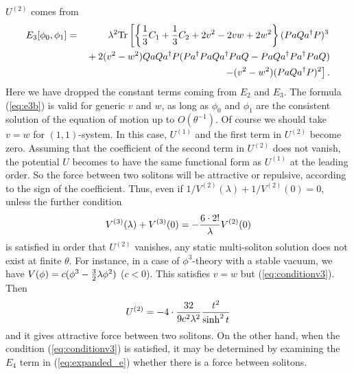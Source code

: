 \documentclass[a4paper,12pt]{article}
\begin{document}
$U^{(2)}$ comes from
\begin{eqnarray}
E_3[\phi_0,\phi_1]
 &=&\lambda^2{\rm Tr}\left[
 \left\{{1\over3}C_1
 +{1\over3}C_2
 + 2v^2 - 2vw +2w^2 \right\}( P  a Q a^\dagger  P )^3
 \right.\nonumber\\
&&{}
 + 2(v^2-w^2) Q  a Q a^\dagger P
 ( P a^\dagger P  a Q a^\dagger P  a Q
 -  P  a Q a^\dagger P a^\dagger P  a Q  )\nonumber\\
&&{} \left.- (v^2-w^2) ( P  a Q a^\dagger  P )^2 \right].
\label{eq:e3b}
\end{eqnarray}
Here we have dropped the constant terms coming from $E_2$ and $E_3$.
The formula (\ref{eq:e3b}) is valid for generic $v$ and $w$,
as long as $\phi_0$ and $\phi_1$ are
the consistent solution of the equation of motion up to $O(\theta^{-1})$.
Of course we should take $v=w$ for $(1,1)$-system.
In this case, $U^{(1)}$ and
the first term in $U^{(2)}$ become zero.
Assuming that
the coefficient of the second term in $U^{(2)}$ does not vanish,
the potential $U$ becomes to have the same functional form as $U^{(1)}$
at the leading order.
So the force between two solitons will be attractive or repulsive,
according to the sign of the coefficient.
Thus,
even if $1/V^{(2)}(\lambda)+1/V^{(2)}(0)=0$,
unless the further condition
\begin{equation}
V^{(3)}(\lambda)+V^{(3)}(0)=-{6\cdot 2!\over\lambda}V^{(2)}(0)
\label{eq:conditionv3}
\end{equation}
is satisfied in order that $U^{(2)}$ vanishes,
any static multi-soliton solution does not exist at finite $\theta$.
For instance, in a case of $\phi^3$-theory with a stable vacuum,
we have $V(\phi)=c(\phi^3-{3\over2}\lambda\phi^2)$ ($c<0$).
This satisfies $v=w$ but (\ref{eq:conditionv3}).
Then
\begin{equation}
U^{(2)}=-4\cdot {32\over 9c^2\lambda^2}{t^2\over\sinh^2 t}
\end{equation}
and it gives attractive force between two solitons.
On the other hand,
when the condition (\ref{eq:conditionv3}) is satisfied,
it may be determined by examining the $E_4$ term in (\ref{eq:expanded_e})
whether there is a force between solitons.
\end{document}
